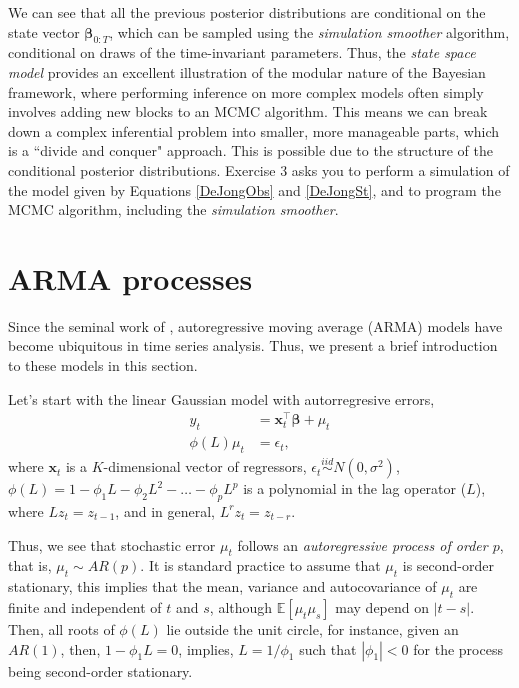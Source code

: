 We can see that all the previous posterior distributions are conditional on the state vector $\bm{\beta}_{0:T}$, which can be sampled using the \textit{simulation smoother} algorithm, conditional on draws of the time-invariant parameters. Thus, the \textit{state space model} provides an excellent illustration of the modular nature of the Bayesian framework, where performing inference on more complex models often simply involves adding new blocks to an MCMC algorithm. This means we can break down a complex inferential problem into smaller, more manageable parts, which is a ``divide and conquer" approach. This is possible due to the structure of the conditional posterior distributions. Exercise 3 asks you to perform a simulation of the model given by Equations \ref{DeJongObs} and \ref{DeJongSt}, and to program the MCMC algorithm, including the \textit{simulation smoother}.

\section{ARMA processes}\label{sec82}

Since the seminal work of \cite{box_jenkins_1976}, autoregressive moving average (ARMA) models have become ubiquitous in time series analysis. Thus, we present a brief introduction to these models in this section.

Let's start with the linear Gaussian model with autorregresive errors,
\begin{align}
	y_t & = \bm{x}_t^{\top}\bm{\beta}+\mu_t\label{eq1}\\
	\phi(L)\mu_t & = \epsilon_t \label{eq2}, 
\end{align}
where $\bm{x}_t$ is a $K$-dimensional vector of regressors, $\epsilon_t \stackrel{iid}{\sim} N(0,\sigma^2)$, $\phi(L)=1-\phi_1L-\phi_2L^2-\dots-\phi_pL^p$ is a polynomial in the lag operator ($L$), where $Lz_t=z_{t-1}$, and in general, $L^rz_t=z_{t-r}$.

Thus, we see that stochastic error $\mu_t$ follows an \textit{autoregressive process of order $p$}, that is, $\mu_t\sim AR(p)$. It is standard practice to assume that $\mu_t$ is second-order stationary, this implies that the mean, variance and autocovariance of $\mu_t$ are finite and independent of $t$ and $s$, although $\mathbb{E}[\mu_t\mu_s]$ may depend on $|t-s|$. Then, all roots of $\phi(L)$ lie outside the unit circle, for instance, given an $AR(1)$, then, $1-\phi_1L=0$, implies, $L=1/\phi_1$ such that  $|\phi_1|<0$ for the process being second-order stationary.

